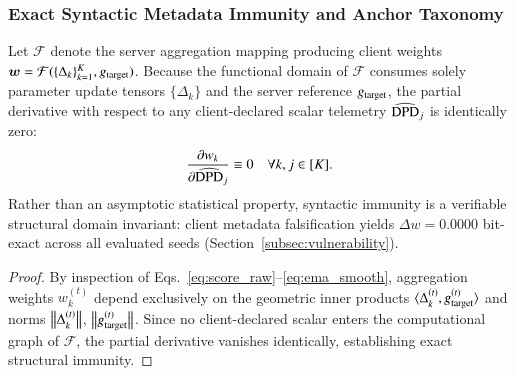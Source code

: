 \subsubsection{Exact Syntactic Metadata Immunity and Anchor Taxonomy}
\label{subsubsec:theory_immunity}
\begin{theorem}
\label{thm:syntactic_immunity}
Let $\mathcal{F}$ denote the server aggregation mapping producing client weights $\bm{w} = \mathcal{F}(\{\Delta_k\}_{k=1}^K, g_{\mathrm{target}})$. Because the functional domain of $\mathcal{F}$ consumes solely parameter update tensors $\{\Delta_k\}$ and the server reference $g_{\mathrm{target}}$, the partial derivative with respect to any client-declared scalar telemetry $\widehat{\mathrm{DPD}}_j$ is identically zero:
\begin{equation}
\label{eq:zero_deriv}
\frac{\partial w_k}{\partial \widehat{\mathrm{DPD}}_j} \equiv 0 \quad \forall k, j \in [K].
\end{equation}
Rather than an asymptotic statistical property, syntactic immunity is a verifiable structural domain invariant: client metadata falsification yields $\Delta w = 0.0000$ bit-exact across all evaluated seeds (Section~\ref{subsec:vulnerability}).
\end{theorem}
\begin{proof}
By inspection of Eqs.~\eqref{eq:score_raw}--\eqref{eq:ema_smooth}, aggregation weights $w_k^{(t)}$ depend exclusively on the geometric inner products $\langle \Delta_k^{(t)}, g_{\mathrm{target}}^{(t)} \rangle$ and norms $\left\lVert \Delta_k^{(t)} \right\rVert$, $\left\lVert g_{\mathrm{target}}^{(t)} \right\rVert$. Since no client-declared scalar enters the computational graph of $\mathcal{F}$, the partial derivative vanishes identically, establishing exact structural immunity.
\end{proof}

